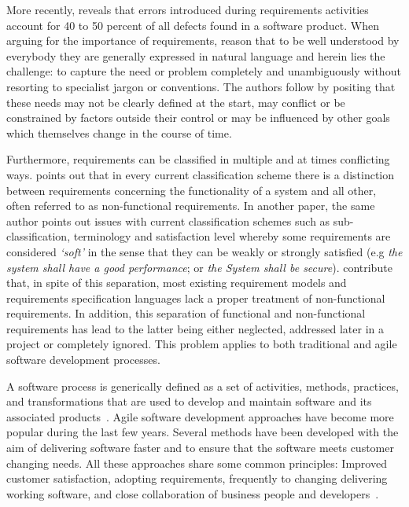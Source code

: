 \documentclass[dissertation,final]{softeng}
\begin{document}
More recently, \citet{Davis200505} reveals that errors introduced during requirements activities account for 40 to 50 percent of all defects found in a software product.  When arguing for the importance of requirements, \citet{Hull2011} reason that to be well understood by everybody they are generally expressed in natural language and herein lies the challenge: to capture the need or problem completely and unambiguously without resorting to specialist jargon or conventions. The authors follow by positing that these needs may not be clearly defined at the start, may conflict or be constrained by factors outside their control or may be influenced by other goals which themselves change in the course of time.

Furthermore, requirements can be classified in multiple and at times conflicting ways. \citet{Glinz:2007ehba} points out that in every current classification scheme there is a distinction between requirements concerning the functionality of a system and all other, often referred to as non-functional requirements. In another paper, the same author points out issues with current classification schemes such as sub-classification, terminology and satisfaction level whereby some requirements are considered \emph{`soft'} in the sense that they can be weakly or strongly satisfied (e.g \emph{the system shall have a good performance}; or \emph{the System shall be secure}). \citet{Chung:2009vg} contribute that, in spite of this separation, most existing requirement models and requirements specification languages lack a proper treatment of non-functional requirements. In addition, this separation of functional and non-functional requirements has lead to the latter being either neglected, addressed later in a project or completely ignored. This problem applies to both traditional and agile software development processes. 

A software process is generically defined as a set of activities, methods, practices, and transformations that are used to develop and maintain software and its associated products~\citep{Cugola:1998htba}. Agile software development approaches have become more popular during the last few years. Several methods have been developed with the aim of delivering software faster and to ensure that the software meets customer changing needs. All these approaches share some common principles: Improved customer satisfaction, adopting requirements, frequently to changing delivering working software, and close collaboration of business people and developers~\citep{Paetsch:2003tl}.
\end{document}
